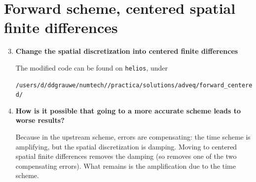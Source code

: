 \documentclass[a4paper,fleqn]{article}
\begin{document}
\section{Forward scheme, centered spatial finite differences}
%
\begin{enumerate}
	\setcounter{enumi}{2}
	\item \textbf{Change the spatial discretization into centered finite differences}
		\par
		The modified code can be found on \texttt{helios}, under
		\par
		\texttt{/users/d/ddgrauwe/numtech/\unskip/practica/solutions/adveq/forward\_centered/}\vspace{2ex}
	\setcounter{enumi}{5}
	\item \textbf{ How is it possible that going to a more accurate scheme leads to worse results?}
		\par
		Because in the upstream scheme, errors are compensating: the time scheme is amplifying, but the spatial discretization is damping. Moving to centered spatial finite differences removes the damping (so removes one of the two compensating errors). What remains is the amplification due to the time scheme.
\end{enumerate}
%
\end{document}
